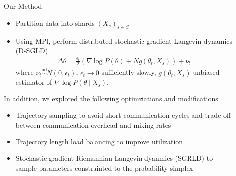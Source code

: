 \documentclass[final]{beamer}
\newlength{\sepwid}
\newlength{\onecolwid}
\newlength{\twocolwid}
\begin{document}
\begin{frame}[t]
\begin{columns}[t]
\begin{column}{\onecolwid}
\begin{block}{Our Method}
  \begin{itemize}
    \item Partition data into shards $(X_s)_{s \in S}$
    \item Using MPI, perform distributed stochastic gradient Langevin dynamics (D-SGLD) \cite{ahn2014distributed}
      \begin{align}
        \Delta \theta = \frac{\epsilon_t}{2}\left( \nabla \log P(\theta) + N g(\theta_t, X_s) \right) + \nu_t
      \end{align}
      where $\nu_t \overset{\text{iid}}{\sim} N(0, \epsilon_t)$, $\epsilon_t \to 0$ sufficiently slowly,
      $g(\theta_t, X_s)$ unbiased estimator of $\nabla \log P(\theta \mid X_s)$.
  \end{itemize}

  In addition, we explored the following optimziations and modifications
  \begin{itemize}
    \item Trajectory sampling to avoid short communication cycles and
      trade off between communication overhead and mixing rates \citep{ahn2014distributed}
    \item Trajectory length load balancing to improve utilization \citep{ahn2014distributed}
    \item Stochastic gradient Riemannian Langevin dyanmics (SGRLD) to sample
      parameters constrainted to the probability simplex \cite{patterson2013stochastic}
  \end{itemize}


\end{block}




\end{column} %

\begin{column}{\sepwid}\end{column} %

\begin{column}{\twocolwid} %


\end{column}
\end{columns}
\end{frame}
\end{document}
